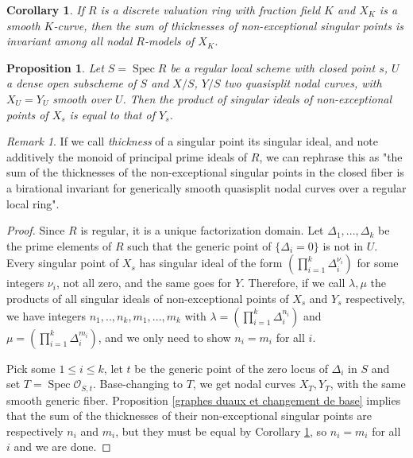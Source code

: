 \documentclass[a4paper,10pt,twoside]{article}
\renewcommand{\O}{\mathcal{O}}
\DeclareMathOperator{\spec}{Spec}
\newtheorem{cor}[thm]{Corollary}
\newtheorem{prop}[thm]{Proposition}
\theoremstyle{definition}
\theoremstyle{remark}
\newtheorem{rem}{Remark}[thm]
\begin{document}
\begin{cor}\label{corollary invariance of the sum of thicknesses of non exceptional points over a dvr}
If $R$ is a discrete valuation ring with fraction field $K$ and $X_K$ is a smooth $K$-curve, then the sum of thicknesses of non-exceptional singular points is invariant among all nodal $R$-models of $X_K$.
\end{cor}

\begin{prop}\label{prop invariance of the sum of thicknesses of non exceptional points}
Let $S=\spec R$ be a regular local scheme with closed point $s$, $U$ a dense open subscheme of $S$ and $X/S$, $Y/S$ two quasisplit nodal curves, with $X_U=Y_U$ smooth over $U$. Then the product of singular ideals of non-exceptional points of $X_s$ is equal to that of $Y_s$.
\end{prop}

\begin{rem}\label{locrem1}
If we call \emph{thickness} of a singular point its singular ideal, and note additively the monoid of principal prime ideals of $R$, we can rephrase this as "the sum of the thicknesses of the non-exceptional singular points in the closed fiber is a birational invariant for generically smooth quasisplit nodal curves over a regular local ring".
\end{rem}

\begin{proof}
Since $R$ is regular, it is a unique factorization domain. Let $\Delta_1,...,\Delta_k$ be the prime elements of $R$ such that the generic point of $\{\Delta_i=0\}$ is not in $U$. Every singular point of $X_s$ has singular ideal of the form $\left(\prod\limits_{i=1}^k \Delta_i^{\nu_i}\right)$ for some integers $\nu_i$, not all zero, and the same goes for $Y$. Therefore, if we call $\lambda,\mu$ the products of all singular ideals of non-exceptional points of $X_s$ and $Y_s$ respectively, we have integers $n_1,..,n_k,m_1,...,m_k$ with $\lambda=\left(\prod\limits_{i=1}^k \Delta_i^{n_i}\right)$ and $\mu=\left(\prod\limits_{i=1}^k \Delta_i^{m_i}\right)$, and we only need to show $n_i=m_i$ for all $i$.

Pick some $1\leq i\leq k$, let $t$ be the generic point of the zero locus of $\Delta_i$ in $S$ and set $T=\spec\O_{S,t}$. Base-changing to $T$, we get nodal curves $X_T,Y_T$, with the same smooth generic fiber. Proposition \ref{graphes duaux et changement de base} implies that the sum of the thicknesses of their non-exceptional singular points are respectively $n_i$ and $m_i$, but they must be equal by Corollary \ref{corollary invariance of the sum of thicknesses of non exceptional points over a dvr}, so $n_i=m_i$ for all $i$ and we are done.
\end{proof}
\end{document}
